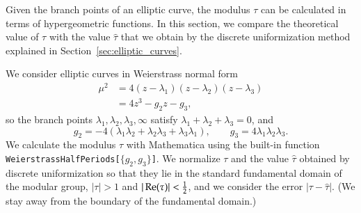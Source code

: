 \documentclass[Thesis]{subfiles}
\begin{document}
Given the branch points of an elliptic curve, the
modulus $\tau$ can be calculated in terms of hypergeometric
functions. In this section, we compare the theoretical value of $\tau$
with the value $\hat\tau$ that we obtain by the discrete uniformization
method explained in Section~\ref{sec:elliptic_curves}.


We consider elliptic curves in Weierstrass normal form
\begin{equation}
  \label{eq:Weierstrass_normal_form}
  \begin{split}
    \mu^2
    &=4(z-\lambda_1)(z-\lambda_2)(z-\lambda_3)\\
    &=4z^3-g_2z-g_3,
  \end{split}
\end{equation}
so the branch points $\lambda_{1},\lambda_{2},\lambda_{3},\infty$
satisfy $\lambda_1+\lambda_2+\lambda_3=0$, and 
\begin{equation}
  \label{eq:g-invariants}
  g_{2}=-4(\lambda_1\lambda_2+\lambda_2\lambda_3+\lambda_3\lambda_1),
  \qquad 
  g_{3}=4\lambda_1\lambda_2\lambda_3.
\end{equation}
We calculate the modulus $\tau$ with Mathematica using the built-in
function
\texttt{Wei\-er\-strass\-Half\-Pe\-ri\-ods[$\{g_2,g_3\}$]}. We
normalize $\tau$ and the value $\hat\tau$ obtained by discrete
uniformization so that they lie in the standard fundamental domain of
the modular group, $|\tau|>1$ and $|\operatorname{Re}(\tau)| < \frac{1}{2}$, and we
consider the error $|\tau-\hat \tau|$. (We stay away from the boundary
of the fundamental domain.)

\end{document}
